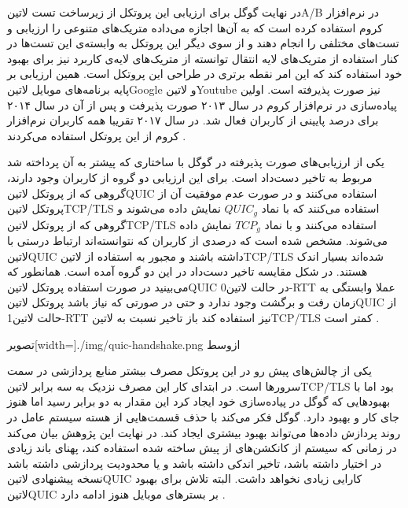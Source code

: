 در نهایت گوگل برای ارزیابی این پروتکل از زیرساخت تست ‌لاتین{A/B} در نرم‌افزار کروم استفاده کرده است که به آن‌ها اجازه می‌داده متریک‌های متنوعی را ارزیابی و تست‌های مختلفی را انجام دهند
و از سوی دیگر این پروتکل به وابسته‌ی این تست‌ها در کنار استفاده از متریک‌های لایه انتقال توانسته از متریک‌های لایه‌ی کاربرد نیز برای بهبود خود استفاده کند که این امر نقطه برتری در طراحی این پروتکل است.
همین ارزیابی بر پایه برنامه‌های موبایل ‌لاتین{Google} و ‌لاتین{Youtube} نیز صورت پذیرفته است.
اولین پیاده‌سازی در نرم‌افزار کروم در سال ۲۰۱۳ صورت پذیرفت و پس از آن در سال ۲۰۱۴ برای درصد پایینی از کاربران فعال شد. در سال ۲۰۱۷ تقریبا همه کاربران نرم‌افزار کروم از این پروتکل استفاده می‌کردند
.

یکی از ارزیابی‌های صورت پذیرفته در گوگل با ساختاری که پیشتر به آن پرداخته شد مربوط به تاخیر دست‌داد است. برای این ارزیابی دو گروه از کاربران وجود دارند، گروهی که از پروتکل ‌لاتین{QUIC} استفاده می‌کنند
و در صورت عدم موفقیت آن از پروتکل ‌لاتین{TCP/TLS} استفاده می‌کنند که با نماد $QUIC_{g}$ نمایش داده می‌شوند و گروهی که از پروتکل ‌لاتین{TCP/TLS} استفاده می‌کنند و با نماد $TCP_{g}$
نمایش داده می‌شوند. مشخص شده است که درصدی از کاربران که نتوانسته‌اند ارتباط درستی با ‌لاتین{QUIC} داشته باشند و مجبور به استفاده از ‌لاتین{TCP/TLS} شده‌اند بسیار اندک هستند.
در شکل  مقایسه تاخیر دست‌داد در این دو گروه آمده است. همانطور که می‌بینید در صورت استفاده پروتکل ‌لاتین{QUIC} در حالت ‌لاتین{0-RTT}
عملا وابستگی به زمان رفت و برگشت وجود ندارد و حتی در صورتی که نیاز باشد پروتکل ‌لاتین{QUIC} از حالت ‌لاتین{1-RTT} نیز استفاده کند باز تاخیر نسبت به ‌لاتین{TCP/TLS} کمتر است
.

‌تصویر[width=\textwidth]{./img/quic-handshake.png}
‌ازوسط

یکی از چالش‌های پیش رو در این پروتکل مصرف بیشتر منابع پردازشی در سمت سرورها است. در ابتدای کار این مصرف نزدیک به سه برابر ‌لاتین{TCP/TLS} بود اما با بهبودهایی که گوگل در پیاده‌سازی خود ایجاد کرد
این مقدار به دو برابر رسید اما هنوز جای کار و بهبود دارد. گوگل فکر می‌کند با حذف قسمت‌هایی از هسته سیستم عامل در روند پردازش داده‌ها می‌تواند بهبود بیشتری ایجاد کند.
در نهایت این پژوهش بیان می‌کند در زمانی که سیستم از کانکشن‌های از پیش ساخته شده استفاده کند، پهنای باند زیادی در اختیار داشته باشد، تاخیر اندکی داشته باشد و یا محدودیت پردازشی داشته باشد نسخه پیشنهادی
‌لاتین{QUIC} کارایی زیادی نخواهد داشت. البته تلاش برای بهبود ‌لاتین{QUIC} بر بسترهای موبایل هنوز ادامه دارد
.

